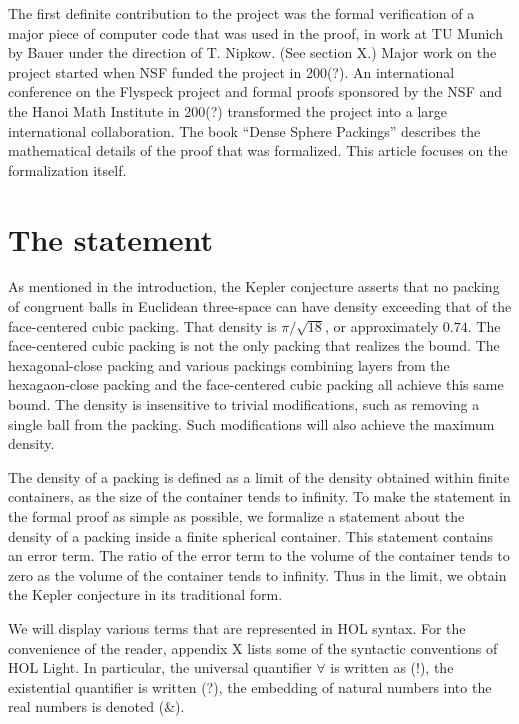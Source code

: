 The first  definite contribution to the project was the formal verification of a major piece of
computer code that was used in the proof, in work at TU Munich by Bauer under the direction of T. Nipkow. (See section X.)
Major work on the project started when NSF funded
the project in 200(?).   An international conference on the Flyspeck project and formal proofs sponsored by the NSF and the
Hanoi Math Institute in 200(?) transformed the project into a large international collaboration.
The book ``Dense Sphere Packings'' describes the mathematical details of the proof that was formalized.  This article
focuses on the formalization itself.



\section{The statement}

As mentioned in the introduction, 
the Kepler conjecture asserts that no packing of congruent balls in Euclidean three-space can have density exceeding
that of the face-centered cubic packing.  That density is $\pi/\sqrt{18}$, or approximately $0.74$.    The face-centered
cubic packing is not the only packing that realizes the bound.   The hexagonal-close packing and various packings
combining layers from the hexagaon-close packing and the face-centered cubic packing all achieve this same bound.
The density is insensitive to trivial modifications, such as removing a single ball from the packing.   Such modifications
will also achieve the maximum density.

The density of a packing is defined as a limit of the density obtained within finite containers, as the size of the container
tends to infinity.  To make the statement in the formal proof as simple as possible, we formalize a statement about the
density of a packing inside a finite spherical container.  This statement contains an error term.  The ratio
of the error term to the volume of the container  tends to zero as the volume of
the container tends to infinity.  Thus in the limit, we obtain the Kepler conjecture in its traditional form.


We will display various terms that are represented in HOL syntax.  For the convenience of the reader, appendix X lists
some of the syntactic conventions of HOL Light.  In particular, the universal quantifier $\forall$ is written as (!), the
existential quantifier is written (?),  the embedding of natural numbers into the real numbers is denoted (\&).



